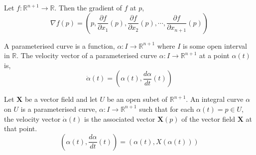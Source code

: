 \begin{definition}
	Let $f : \mathbb{R}^{n+1} \to \mathbb{R}$. Then the gradient of $f$ at $p$,
	\begin{equation}
		\nabla f(p) = \left(p,\frac{\partial f}{\partial x_1}(p),\frac{\partial f}{\partial x_2}(p),\cdots,\frac{\partial f}{\partial x_{n+1}}(p)\right)
	\end{equation}
\end{definition}

\begin{definition}
	A parameterised curve is a function, $\alpha : I \to \mathbb{R}^{n+1}$ where $I$ is some open interval in $\mathbb{R}$.
	The velocity vector of a parameterised curve $\alpha : I \to \mathbb{R}^{n+1}$ at a point $\alpha(t)$ is,
	\begin{equation}
		\dot{\alpha}(t) = \left(\alpha(t),\frac{d \alpha}{dt} (t)\right)
	\end{equation}
\end{definition}

\begin{definition}
	Let $\mathbf{X}$ be a vector field and let $U$ be an open subet of $\mathbb{R}^{n+1}$.
	An integral curve $\alpha$ on $U$ is a parameterised curve, $\alpha : I \to \mathbb{R}^{n+1}$ such that for each $\alpha(t) = p \in U$, the velocity vector $\dot{\alpha}(t)$ is the associated vector $\mathbf{X}(p)$ of the vector field $\mathbf{X}$ at that point.
	\begin{equation}
		\left(\alpha(t),\frac{d \alpha}{dt}(t)\right) = \left(\alpha(t),X(\alpha(t))\right)
	\end{equation}
\end{definition}


